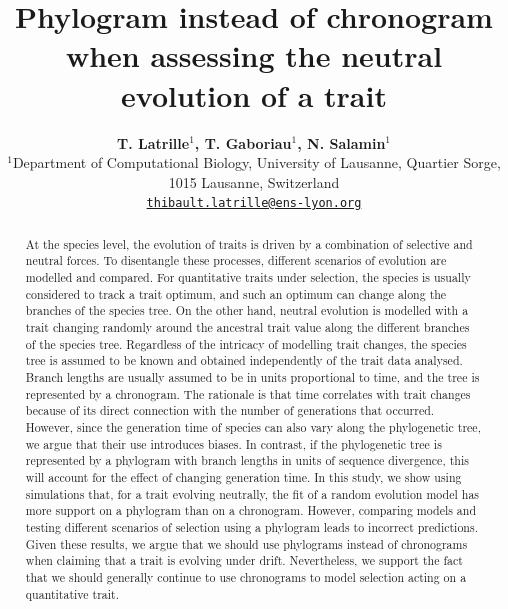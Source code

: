\documentclass{article}
\title{Phylogram instead of chronogram when assessing the neutral evolution of a trait}
\author{
\large
\textbf{T. {Latrille}$^{1}$\orcidlink{0000-0002-9643-4668}, T. {Gaboriau}$^{1}$\orcidlink{0000-0001-7530-2204}, N. {Salamin}$^{1}$\orcidlink{0000-0002-3963-4954}}\\
\normalsize
$^{1}$Department of Computational Biology, University of Lausanne, Quartier Sorge, 1015 Lausanne, Switzerland\\
\texttt{\href{mailto:thibault.latrille@ens-lyon.org}{thibault.latrille@ens-lyon.org}} \\
}
\begin{document}
\maketitle

\begin{abstract}
At the species level, the evolution of traits is driven by a combination of selective and neutral forces. To disentangle these processes, different scenarios of evolution are modelled and compared. For quantitative traits under selection, the species is usually considered to track a trait optimum, and such an optimum can change along the branches of the species tree. On the other hand, neutral evolution is modelled with a trait changing randomly around the ancestral trait value along the different branches of the species tree. Regardless of the intricacy of modelling trait changes, the species tree is assumed to be known and obtained independently of the trait data analysed. Branch lengths are usually assumed to be in units proportional to time, and the tree is represented by a chronogram. The rationale is that time correlates with trait changes because of its direct connection with the number of generations that occurred. However, since the generation time of species can also vary along the phylogenetic tree, we argue that their use introduces biases. In contrast, if the phylogenetic tree is represented by a phylogram with branch lengths in units of sequence divergence, this will account for the effect of changing generation time. In this study, we show using simulations that, for a trait evolving neutrally, the fit of a random evolution model has more support on a phylogram than on a chronogram. However, comparing models and testing different scenarios of selection using a phylogram leads to incorrect predictions. Given these results, we argue that we should use phylograms instead of chronograms when claiming that a trait is evolving under drift. Nevertheless, we support the fact that we should generally continue to use chronograms to model selection acting on a quantitative trait.
\end{abstract}


\newpage
\end{document}
